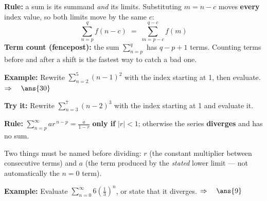 \documentclass[12pt]{article}
\begin{document}


\begin{formulabox}
\textbf{Rule:} a sum is its summand \emph{and} its limits. Substituting $m = n - c$ moves
\textbf{every} index value, so both limits move by the same $c$:
\[ \sum_{n=p}^{q} f(n-c) \;=\; \sum_{m=p-c}^{q-c} f(m) \]
\textbf{Term count (fencepost):} the sum $\sum_{n=p}^{q}$ has $q - p + 1$ terms. Counting
terms before and after a shift is the fastest way to catch a bad one.
\end{formulabox}

\begin{examplebox}
\textbf{Example:} \quad Rewrite $\sum_{n=2}^{5}(n-1)^2$ with the index starting at 1, then
evaluate.
$\Rightarrow\quad \ans{30}$
\end{examplebox}

\begin{tryitbox}
\textbf{Try it:} \quad Rewrite $\sum_{n=3}^{7}(n-2)^3$ with the index starting at 1 and
evaluate it.\\[2pt]
\end{tryitbox}


\begin{formulabox}
\textbf{Rule:} \quad $\displaystyle\sum_{n=p}^{\infty} a r^{\,n-p} = \frac{a}{1-r}$
\quad \textbf{only if} $|r| < 1$; otherwise the series \textbf{diverges} and has no sum.\par
\smallskip
Two things must be named before dividing: $r$ (the constant multiplier between
consecutive terms) and $a$ (the term produced by the \emph{stated} lower limit --- not
automatically the $n = 0$ term).
\end{formulabox}

\begin{examplebox}
\textbf{Example:} \quad Evaluate $\sum_{n=0}^{\infty} 6\left(\frac{1}{3}\right)^{n}$, or
state that it diverges.
$\Rightarrow\quad \ans{9}$
\end{examplebox}
\end{document}
